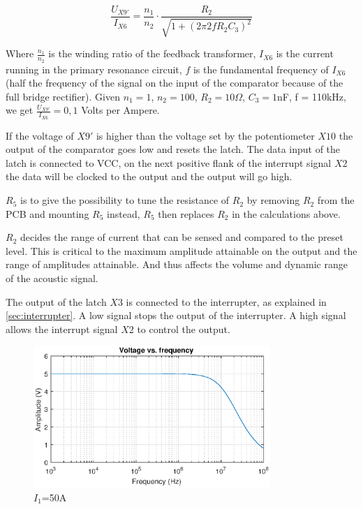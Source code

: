 \begin{equation} \label{eq:limittrans}
    \frac{U_{X9'}}{I_{X6}} = \frac{n_1}{n_2} \cdot \frac{R_2}{\sqrt{1+(2 \pi 2 f R_2 C_3)^2}}
\end{equation}

Where $\frac{n_1}{n_2}$ is the winding ratio of the feedback transformer, $I_{X6}$ is the current running in the primary resonance circuit, $f$ is the fundamental frequency of $I_{X6}$ (half the frequency of the signal on the input of the comparator because of the full bridge rectifier). Given $n_1 = 1$, $n_2 = 100$, $R_2 = 10\Omega$, $C_3 = 1$nF, f = 110kHz, we get $\frac{U_{X9'}}{I_{X6}} = 0,1$ Volts per Ampere.

If the voltage of $X9'$ is higher than the voltage set by the potentiometer $X10$ the output of the comparator goes low and resets the latch. The data input of the latch is connected to VCC, on the next positive flank of the interrupt signal $X2$ the data will be clocked to the output and the output will go high.

$R_5$ is to give the possibility to tune the resistance of $R_2$ by removing $R_2$ from the PCB and mounting $R_5$ instead, $R_5$ then replaces $R_2$ in the calculations above.

$R_2$ decides the range of current that can be sensed and compared to the preset level. This is critical to the maximum amplitude attainable on the output and the range of amplitudes attainable. And thus affects the volume and dynamic range of the acoustic signal.

The output of the latch $X3$ is connected to the interrupter, as explained in \cref{sec:interrupter}. A low signal stops the output of the interrupter. A high signal allows the interrupt signal $X2$ to control the output.


\begin{figure}
    \centering
    \includegraphics[trim={0cm 1.2cm 0cm 2cm},clip,width=0.8\textwidth]{img/LimiterTransfer.eps}
    \caption{$I_1$=50A}
    \label{fig:limitertransfer}
\end{figure}


